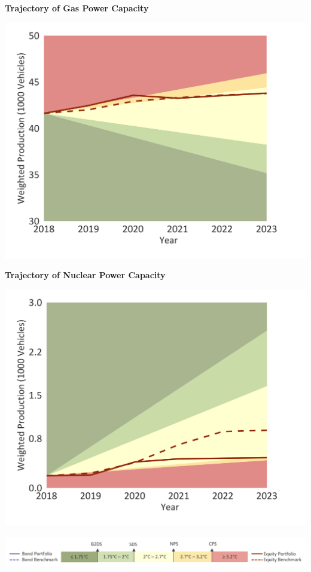 \documentclass[10pt,table,a4]{article}\usepackage[]{graphicx}\usepackage[]{color}
\begin{document}
	\hspace{.02\linewidth}
	\begin{minipage}[t]{.49\textwidth}
		\textbf{Trajectory of Gas Power Capacity }
		
		\includegraphics[trim = {0 0cm 0 0},width=1\linewidth]{CAFigures/Fig24}
		
		\textbf{Trajectory of Nuclear Power Capacity }
		
		\includegraphics[trim = {0 0cm 0 0},width=1\linewidth]{CAFigures/Fig25}
		
	\end{minipage}
	
	\vspace{-0.6cm}
	\begin{center}
		\includegraphics[trim = {0 0cm 0 0},width=.65\linewidth]{ReportGraphics/246Legend.png}
	\end{center}
	
\end{document}
